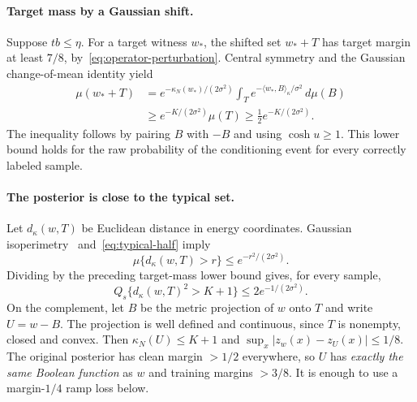 \paragraph{Target mass by a Gaussian shift.}
Suppose $tb\le\eta$. For a target witness $w_*$, the shifted set $w_*+T$
has target margin at least $7/8$, by~\eqref{eq:operator-perturbation}.
Central symmetry and the Gaussian change-of-mean identity yield
\begin{align*}
 \mu(w_*+T)
 &=e^{-\kappa_N(w_*)/(2\sigma^2)}
   \int_T e^{-\langle w_*,B\rangle_\kappa/\sigma^2}\,d\mu(B)\\
 &\ge e^{-K/(2\sigma^2)}\mu(T)
 \ge\tfrac12 e^{-K/(2\sigma^2)}.
\end{align*}
The inequality follows by pairing $B$ with $-B$ and using $\cosh u\ge1$.
This lower bound holds for the raw probability of the conditioning event
for every correctly labeled sample.

\paragraph{The posterior is close to the typical set.}
Let $d_\kappa(w,T)$ be Euclidean distance in energy coordinates. Gaussian
isoperimetry~\cite{borell1975} and~\eqref{eq:typical-half} imply
\[
 \mu\{d_\kappa(w,T)>r\}\le e^{-r^2/(2\sigma^2)}.
\]
Dividing by the preceding target-mass lower bound gives, for every sample,
\begin{equation}\label{eq:posterior-distance-tail}
 Q_s\{d_\kappa(w,T)^2>K+1\}\le2e^{-1/(2\sigma^2)}.
\end{equation}
On the complement, let $B$ be the metric projection of $w$ onto $T$ and
write $U=w-B$. The projection is well defined and continuous, since $T$
is nonempty, closed and convex. Then $\kappa_N(U)\le K+1$ and
$\sup_x|z_w(x)-z_U(x)|\le1/8$. The original posterior has clean margin
$>1/2$ everywhere, so $U$ has \emph{exactly the same Boolean function}
as $w$ and training margins $>3/8$. It is enough to use a margin-$1/4$
ramp loss below.

